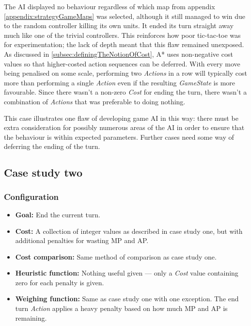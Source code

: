\documentclass[11pt, a4paper]{report}
\begin{document}
The AI displayed no behaviour regardless of which map from appendix \ref{appendix:strategyGameMaps} was selected, although it still managed to win due to the random controller killing its own units. It ended its turn straight away much like one of the trivial controllers. This reinforces how poor tic-tac-toe was for experimentation; the lack of depth meant that this flaw remained unexposed. As discussed in \ref{subsec:definingTheNotionOfCost}, A* uses non-negative cost values so that higher-costed action sequences can be deferred. With every move being penalised on some scale, performing two \emph{Actions} in a row will typically cost more than performing a single \emph{Action} even if the resulting \emph{GameState} is more favourable. Since there wasn't a non-zero \emph{Cost} for ending the turn, there wasn't a combination of \emph{Actions} that was preferable to doing nothing. 

This case illustrates one flaw of developing game AI in this way: there must be extra consideration for possibly numerous areas of the AI in order to ensure that the behaviour is within expected parameters. Further cases need some way of deferring the ending of the turn.

\subsection{Case study two}
\label{subsec:caseStudyTwo}

\subsubsection{Configuration}

\begin{itemize}
  \item \textbf{Goal:} End the current turn.
  \item \textbf{Cost:} A collection of integer values as described in case study one, but with additional penalties for wasting MP and AP.
  \item \textbf{Cost comparison:} Same method of comparison as case study one.
  \item \textbf{Heuristic function:} Nothing useful given --- only a \emph{Cost} value containing zero for each penalty is given.
  \item \textbf{Weighing function:} Same as case study one with one exception. The end turn \emph{Action} applies a heavy penalty based on how much MP and AP is remaining.
\end{itemize}
\end{document}
